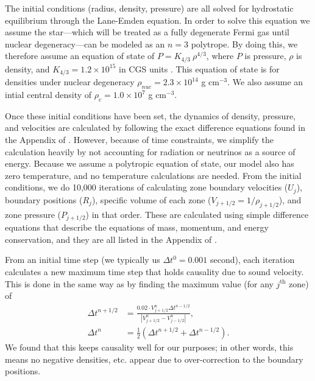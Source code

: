 \documentclass[12pt]{article}
\begin{document}
The initial conditions (radius, density, pressure) are all solved for
hydrostatic equilibrium through the Lane-Emden equation. In order to solve
this equation we assume the star---which will be treated as a fully degenerate
Fermi gas until nuclear degeneracy---can be modeled as an $n=3$ polytrope. By
doing this, we therefore assume an equation of state of
$P = K_{4/3}\ \rho^{4/3}$, where $P$ is pressure, $\rho$ is density, and
$K_{4/3} = 1.2 \times 10^{15}$ in CGS units \citep{arnett66}. This equation of
state is for densities under nuclear degeneracy
$\rho_{nuc} = 2.3 \times 10^{14}$ g cm$^{-3}$. We also assume an intial
central density of $\rho_c = 1.0 \times 10^7$ g cm$^{-3}$.


Once these initial conditions have been set, the dynamics of density, pressure,
and velocities are calculated by following the exact difference equations found
in the Appendix of \citet{arnett66}. However, because of time constraints, we
simplify the calculation heavily by not accounting for radiation or neutrinos
as a source of energy. Because we assume a polytropic equation of state, our
model also has zero temperature, and no temperature calculations are needed.
From the initial conditions, we do 10,000 iterations of calculating zone
boundary velocities ($U_j$), boundary positions ($R_j$), specific volume of
each zone ($V_{j + 1/2} = 1 / \rho_{j + 1/2}$), and zone pressure
($P_{j + 1/2}$) in that order. These are calculated using simple difference
equations that describe the equations of mass, momentum, and energy
conservation, and they are all listed in the Appendix of \citet{arnett66}.

From an initial time step (we typically us $\Delta t^0 = 0.001$ second), each
iteration calculates a new maximum time step that holds causality due to sound
velocity. This is done in the same way as \citet{colgatewhite64} by finding the
maximum value (for any $j^\text{th}$ zone) of
$$
\begin{aligned}
\Delta t^{n + 1/2}
&= \frac{0.02 \cdot V^n_{j + 1/2} \Delta t^{n - 1/2}}
        {|V^n_{j + 1/2} - V^n_{j - 1/2}|}, \\
\Delta t^n
&= \frac{1}{2} (\Delta t^{n + 1/2} + \Delta t^{n - 1/2}).
\end{aligned}
$$
We found that this keeps causality well for our purposes; in other words, this
means no negative densities, etc. appear due to over-correction to the
boundary positions.
\end{document}
